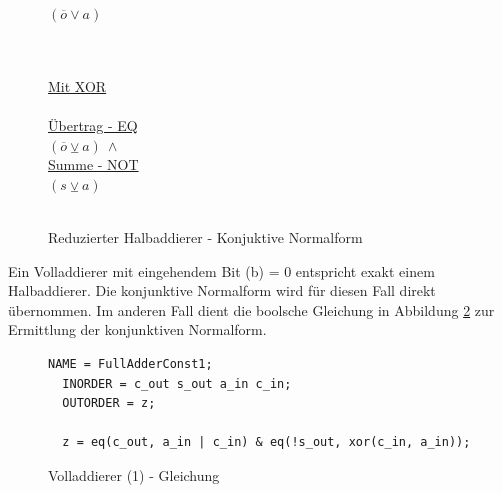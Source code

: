 \begin{figure}[!h]
\begin{minipage}[l]{3.5cm}
    $ (\overline{o} \vee  a) $\\
    ~\\
    ~
  \end{minipage}
  \begin{minipage}[l]{3.5cm}
    \underline{Mit XOR}\\
    ~\\
    \underline{Übertrag - EQ}\\
    $ (\overline{o} \veebar a) ~ \wedge $\\
    \underline{Summe - NOT}\\
    $ (s \veebar a) $\\
    ~
  \end{minipage}
  \caption{Reduzierter Halbaddierer - Konjuktive Normalform}
  \label{fig:red_halfadder_cnf}
\end{figure}

Ein Volladdierer mit eingehendem Bit (b) = 0 entspricht exakt einem Halbaddierer. Die konjunktive Normalform wird für diesen Fall direkt übernommen.
Im anderen Fall dient die boolsche Gleichung in Abbildung \ref{fig:fulladder1_qen} zur Ermittlung der konjunktiven Normalform.
\begin{figure}[!h]
  \centering
  \begin{lstlisting}[]
  NAME = FullAdderConst1;
  INORDER = c_out s_out a_in c_in;
  OUTORDER = z;

  z = eq(c_out, a_in | c_in) & eq(!s_out, xor(c_in, a_in));
  \end{lstlisting}
  \caption{Volladdierer (1) - Gleichung}
  \label{fig:fulladder1_qen}
\end{figure}

